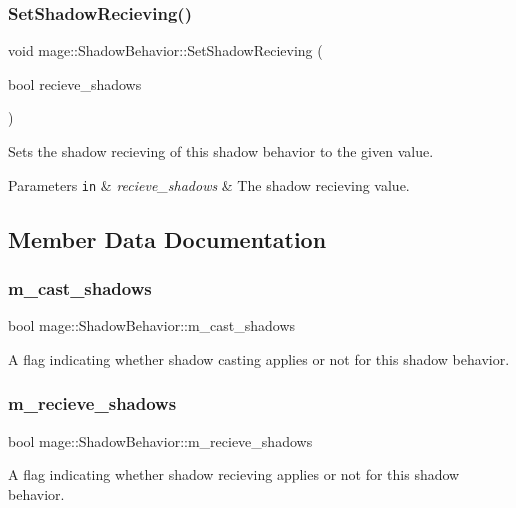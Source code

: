\subsubsection{\texorpdfstring{Set\+Shadow\+Recieving()}{SetShadowRecieving()}}
{\footnotesize\ttfamily void mage\+::\+Shadow\+Behavior\+::\+Set\+Shadow\+Recieving (\begin{DoxyParamCaption}\item[{bool}]{recieve\+\_\+shadows }\end{DoxyParamCaption})\hspace{0.3cm}{\ttfamily [noexcept]}}

Sets the shadow recieving of this shadow behavior to the given value.


\begin{DoxyParams}[1]{Parameters}
\mbox{\tt in}  & {\em recieve\+\_\+shadows} & The shadow recieving value. \\
\hline
\end{DoxyParams}


\subsection{Member Data Documentation}
\hypertarget{structmage_1_1_shadow_behavior_a6547a03bf1871ad4a9c98cc2f72ff297}{}\label{structmage_1_1_shadow_behavior_a6547a03bf1871ad4a9c98cc2f72ff297} 
\subsubsection{\texorpdfstring{m\+\_\+cast\+\_\+shadows}{m\_cast\_shadows}}
{\footnotesize\ttfamily bool mage\+::\+Shadow\+Behavior\+::m\+\_\+cast\+\_\+shadows\hspace{0.3cm}{\ttfamily [private]}}

A flag indicating whether shadow casting applies or not for this shadow behavior. \hypertarget{structmage_1_1_shadow_behavior_a1413297989415472337784adcba739d3}{}\label{structmage_1_1_shadow_behavior_a1413297989415472337784adcba739d3} 
\subsubsection{\texorpdfstring{m\+\_\+recieve\+\_\+shadows}{m\_recieve\_shadows}}
{\footnotesize\ttfamily bool mage\+::\+Shadow\+Behavior\+::m\+\_\+recieve\+\_\+shadows\hspace{0.3cm}{\ttfamily [private]}}

A flag indicating whether shadow recieving applies or not for this shadow behavior. 
